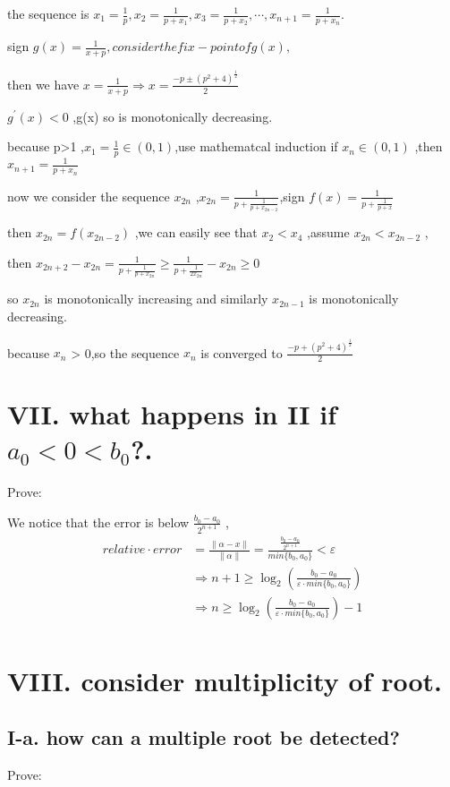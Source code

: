\documentclass[a4paper]{article}
\begin{document}
the sequence is $x_{1}=\frac{1}{p}, x_{2}=\frac{1}{p+x_{1}},x_{3}= \frac{1}{p+x_{2}},\cdots,x_{n+1}= \frac{1}{p+x_{n}}$.

sign $g(x)=\frac{1}{x+p} ,consider the fix-point of g(x),$ 

then we have $x=\frac{1}{x+p} \Rightarrow x = \frac{-p \pm (p^{2}+4)^{\frac{1}{2}}}{2}$  

$g^{'}(x)<0$ ,g(x) so is monotonically decreasing.

because p>1 ,$x_{1} = \frac{1}{p} \in (0,1) $,use mathematcal induction if $x_{n} \in (0,1)$ ,then $x_{n+1}=\frac{1}{p+x_{n}}$

now we consider the sequence $x_{2n}$ ,$x_{2n}=\frac{1}{p+\frac{1}{p+x_{2n-2}}}$,sign $f(x)=\frac{1}{p+\frac{1}{p+x}}$

then $x_{2n}=f(x_{2n-2})$ ,we can easily see that $x_{2}<x_{4}$ ,assume $x_{2n}<x_{2n-2}$ ,

then $x_{2n+2}-x_{2n}= \frac{1}{p+\frac{1}{p+x_{2n}}} \geq \frac{1}{p+\frac{1}{2x_{2n}}}-x_{2n} \geq 0$

so $x_{2n}$ is monotonically increasing and similarly $x_{2n-1}$ is monotonically decreasing.

because $x_{n}$ > 0,so the sequence $x_{n}$ is converged to $\frac{-p+(p^{2}+4)^{\frac{1}{2}}}{2}$

\section*{VII. what happens in II if $a_{0}<0<b_{0}$?.}
Prove:

We notice that the error is below $\frac{b_{0}-a_{0}}{2^{n+1}}$ ,
\begin{align}
relative \cdot error &= \frac{\|\alpha-x\|}{\|\alpha\|} = \frac{\frac{b_{0}-a_{0}}{2^{n+1}}}{min\{b_{0},a_{0}\}} < \varepsilon \\
& \Rightarrow n+1 \geq \log_{2}\left(\frac{b_{0}-a_{0}}{\varepsilon \cdot min\{b_{0},a_{0}\}}\right) \\
&\Rightarrow n \geq \log_{2}\left(\frac{b_{0}-a_{0}}{\varepsilon \cdot min\{b_{0},a_{0}\}}\right)-1 \\
\end{align}



\section*{VIII. consider multiplicity of root.}
\subsection*{I-a. how can a multiple root be detected?}
Prove:
\end{document}
